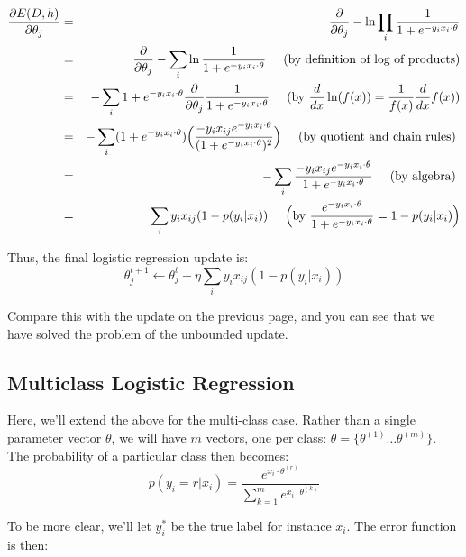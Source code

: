 \documentclass{article}
\begin{document}
\begin{eqnarray*}
\frac{\partial E(D,h)}{\partial \theta_j} & = & \frac{\partial}{\partial \theta_j}- \ln \prod_i \frac{1}{1 + e^{-y_i x_i \cdot \theta}} \\
& = &  \frac{\partial}{\partial \theta_j}-  \sum_i \ln \frac{1}{1 + e^{-y_i x_i \cdot \theta}} \hbox{ \hspace{.1in} (by definition of log of products)}\\
& = &  -  \sum_i 1 + e^{-y_i x_i \cdot \theta} \frac{\partial}{\partial \theta_j} \frac{1}{1 + e^{-y_i x_i \cdot \theta}}  \hbox{ \hspace{.1in} (by }\frac{d}{dx}\ln(f(x)) = \frac{1}{f(x)} \frac{d}{dx}f(x) ) \\
& = &  -  \sum_i (1 + e^{-y_i x_i \cdot \theta})\Big(\frac{-y_ix_{ij} e^{-y_ix_i \cdot \theta}}{(1 + e^{-y_ix_i\cdot \theta})^2}\Big) \hbox{ \hspace{.1in} (by quotient and chain rules) }\\
& = & - \sum_i \frac{-y_i x_{ij} e^{-y_i x_i \cdot \theta}}{1 + e^{-y_i x_i \cdot \theta}} \hbox{ \hspace{.1in} (by algebra) }\\
& = & \sum_i y_i x_{ij} (1 - p(y_i | x_i)) \hbox{ \hspace{.1in} } \Big( \hbox{by }\frac{e^{-y_i x_i \cdot \theta}}{1 + e^{-y_i x_i \cdot \theta}} = 1 - p(y_i|x_i) \Big)
\end{eqnarray*}

Thus, the final logistic regression update is:
$$
\theta_j^{t+1} \leftarrow \theta_j^{t} + \eta \sum_i y_i x_{ij}(1-p(y_i|x_i))
$$

Compare this with the update on the previous page, and you can see that we have solved the problem of the unbounded update.

\subsection*{Multiclass Logistic Regression}

Here, we'll extend the above for the multi-class case. Rather than a single parameter vector $\theta$, we will have $m$ vectors, one per class: $\theta = \{\theta^{(1)} \ldots \theta^{(m)}\}$. The probability of a particular class then becomes:
$$
p(y_i=r|x_i) = \frac{e^{x_i \cdot \theta^{(r)}}}{\sum_{k=1}^m e^{x_i \cdot \theta^{(k)}} }
$$

To be more clear, we'll let $y_i^*$ be the true label for instance $x_i$. The error function is then:
\end{document}
